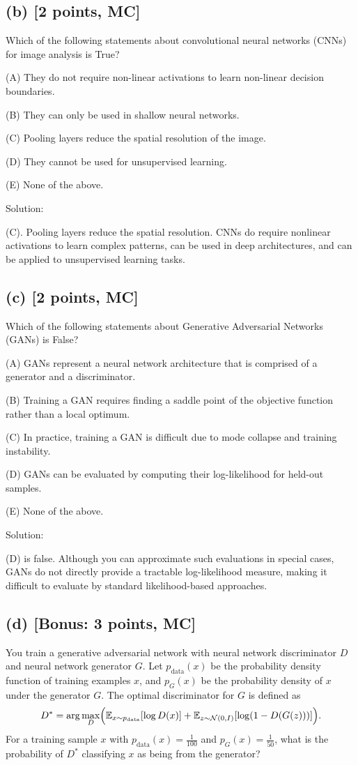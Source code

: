 \documentclass[twocolumn]{article}
\begin{document}
\begin{spacing}{1}
\subsection*{(b) [2 points, MC]}
Which of the following statements about convolutional neural networks (CNNs) for image analysis is True?

(A) They do not require non-linear activations to learn non-linear decision boundaries.

(B) They can only be used in shallow neural networks.

(C) Pooling layers reduce the spatial resolution of the image.

(D) They cannot be used for unsupervised learning.

(E) None of the above.

Solution:

(C). Pooling layers reduce the spatial resolution. CNNs do require nonlinear activations to learn complex patterns, can be used in deep architectures, and can be applied to unsupervised learning tasks.

\subsection*{(c) [2 points, MC]}
Which of the following statements about Generative Adversarial Networks (GANs) is False?

(A) GANs represent a neural network architecture that is comprised of a generator and a discriminator.

(B) Training a GAN requires finding a saddle point of the objective function rather than a local optimum.

(C) In practice, training a GAN is difficult due to mode collapse and training instability.

(D) GANs can be evaluated by computing their log-likelihood for held-out samples.

(E) None of the above.

Solution:

(D) is false. Although you can approximate such evaluations in special cases, GANs do not directly provide a tractable log-likelihood measure, making it difficult to evaluate by standard likelihood-based approaches.

\subsection*{(d) [Bonus: 3 points, MC]}
You train a generative adversarial network with neural network discriminator \(D\) and neural network generator \(G\). Let \(p_{\text{data}}(x)\) be the probability density function of training examples \(x\), and \(p_G(x)\) be the probability density of \(x\) under the generator \(G\). The optimal discriminator for \(G\) is defined as
\[
D^* = \arg\max_{D} \Bigl(\mathbb{E}_{x\sim p_{\text{data}}}[\log D(x)] + \mathbb{E}_{z\sim\mathcal{N}(0,I)}[\log(1-D(G(z)))]\Bigr).
\]
For a training sample \(x\) with \(p_{\text{data}}(x) = \frac{1}{100}\) and \(p_G(x) = \frac{1}{50}\), what is the probability of \(D^*\) classifying \(x\) as being from the generator?


\end{spacing}
\end{document}

